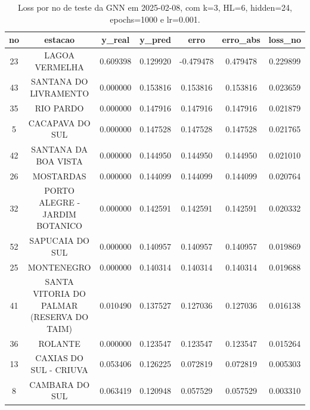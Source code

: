 \begin{table}[h]
\centering
\caption{Loss por no de teste da GNN em 2025-02-08, com k=3, HL=6, hidden=24, epochs=1000 e lr=0.001.}
\label{tab:gnn_loss_k3_hl6_h24_e1000_d20250208}
\begin{tabular}{ccccccc}
\toprule
no & estacao & y\_real & y\_pred & erro & erro\_abs & loss\_no \\
\midrule
23 & LAGOA VERMELHA & 0.609398 & 0.129920 & -0.479478 & 0.479478 & 0.229899 \\
43 & SANTANA DO LIVRAMENTO & 0.000000 & 0.153816 & 0.153816 & 0.153816 & 0.023659 \\
35 & RIO PARDO & 0.000000 & 0.147916 & 0.147916 & 0.147916 & 0.021879 \\
5 & CACAPAVA DO SUL & 0.000000 & 0.147528 & 0.147528 & 0.147528 & 0.021765 \\
42 & SANTANA DA BOA VISTA & 0.000000 & 0.144950 & 0.144950 & 0.144950 & 0.021010 \\
26 & MOSTARDAS & 0.000000 & 0.144099 & 0.144099 & 0.144099 & 0.020764 \\
32 & PORTO ALEGRE - JARDIM BOTANICO & 0.000000 & 0.142591 & 0.142591 & 0.142591 & 0.020332 \\
52 & SAPUCAIA DO SUL & 0.000000 & 0.140957 & 0.140957 & 0.140957 & 0.019869 \\
25 & MONTENEGRO & 0.000000 & 0.140314 & 0.140314 & 0.140314 & 0.019688 \\
41 & SANTA VITORIA DO PALMAR (RESERVA DO TAIM) & 0.010490 & 0.137527 & 0.127036 & 0.127036 & 0.016138 \\
36 & ROLANTE & 0.000000 & 0.123547 & 0.123547 & 0.123547 & 0.015264 \\
13 & CAXIAS DO SUL - CRIUVA & 0.053406 & 0.126225 & 0.072819 & 0.072819 & 0.005303 \\
8 & CAMBARA DO SUL & 0.063419 & 0.120948 & 0.057529 & 0.057529 & 0.003310 \\
\bottomrule
\end{tabular}
\end{table}
